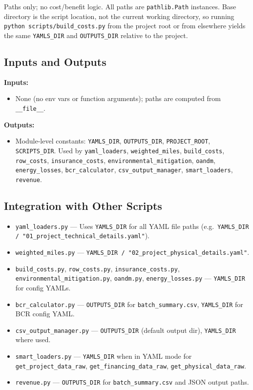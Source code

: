 \documentclass[ctcc_full_documentation.tex]{subfiles}
\begin{document}
Paths only; no cost/benefit logic. All paths are \texttt{pathlib.Path} instances. Base directory is the script location, not the current working directory, so running \texttt{python scripts/build\_costs.py} from the project root or from elsewhere yields the same \texttt{YAMLS\_DIR} and \texttt{OUTPUTS\_DIR} relative to the project.

\subsection{Inputs and Outputs}

\textbf{Inputs:}
\begin{itemize}
    \item None (no env vars or function arguments); paths are computed from \texttt{\_\_file\_\_}.
\end{itemize}

\textbf{Outputs:}
\begin{itemize}
    \item Module-level constants: \texttt{YAMLS\_DIR}, \texttt{OUTPUTS\_DIR}, \texttt{PROJECT\_ROOT}, \texttt{SCRIPTS\_DIR}. Used by \texttt{yaml\_loaders}, \texttt{weighted\_miles}, \texttt{build\_costs}, \texttt{row\_costs}, \texttt{insurance\_costs}, \texttt{environmental\_mitigation}, \texttt{oandm}, \texttt{energy\_losses}, \texttt{bcr\_calculator}, \texttt{csv\_output\_manager}, \texttt{smart\_loaders}, \texttt{revenue}.
\end{itemize}

\subsection{Integration with Other Scripts}

\begin{itemize}
    \item \texttt{yaml\_loaders.py} --- Uses \texttt{YAMLS\_DIR} for all YAML file paths (e.g.\ \texttt{YAMLS\_DIR / "01\_project\_technical\_details.yaml"}).
    \item \texttt{weighted\_miles.py} --- \texttt{YAMLS\_DIR / "02\_project\_physical\_details.yaml"}.
    \item \texttt{build\_costs.py}, \texttt{row\_costs.py}, \texttt{insurance\_costs.py}, \texttt{environmental\_mitigation.py}, \texttt{oandm.py}, \texttt{energy\_losses.py} --- \texttt{YAMLS\_DIR} for config YAMLs.
    \item \texttt{bcr\_calculator.py} --- \texttt{OUTPUTS\_DIR} for \texttt{batch\_summary.csv}, \texttt{YAMLS\_DIR} for BCR config YAML.
    \item \texttt{csv\_output\_manager.py} --- \texttt{OUTPUTS\_DIR} (default output dir), \texttt{YAMLS\_DIR} where used.
    \item \texttt{smart\_loaders.py} --- \texttt{YAMLS\_DIR} when in YAML mode for \texttt{get\_project\_data\_raw}, \texttt{get\_financing\_data\_raw}, \texttt{get\_physical\_data\_raw}.
    \item \texttt{revenue.py} --- \texttt{OUTPUTS\_DIR} for \texttt{batch\_summary.csv} and JSON output paths.
\end{itemize}
\end{document}
